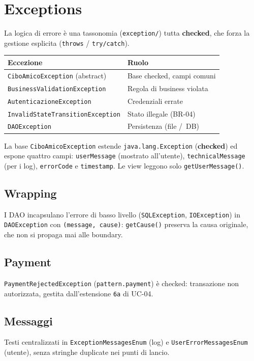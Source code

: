 \chapter{Exceptions}
\label{cap:exceptions}

La logica di errore è una tassonomia (\texttt{exception/}) tutta
\textbf{checked}, che forza la gestione esplicita (\texttt{throws} /
\texttt{try/catch}).

\begin{center}
\begin{tabular}{@{}ll@{}}
\toprule
\textbf{Eccezione} & \textbf{Ruolo} \\
\midrule
\texttt{CiboAmicoException} (abstract) & Base checked, campi comuni \\
\texttt{BusinessValidationException} & Regola di business violata \\
\quad\texttt{AutenticazioneException} & Credenziali errate \\
\quad\texttt{InvalidStateTransitionException} & Stato illegale (BR-04) \\
\texttt{DAOException} & Persistenza (file /\ DB) \\
\bottomrule
\end{tabular}
\end{center}

La base \texttt{CiboAmicoException} estende \texttt{java.lang.Exception}
(\textbf{checked}) ed espone quattro campi: \texttt{userMessage} (mostrato
all'utente), \texttt{technicalMessage} (per i log), \texttt{errorCode} e
\texttt{timestamp}. Le view leggono solo \texttt{getUserMessage()}.

\section{Wrapping}
\label{sec:exc_wrapping}

I DAO incapsulano l'errore di basso livello (\texttt{SQLException},
\texttt{IOException}) in \texttt{DAOException} con
\texttt{(message, cause)}: \texttt{getCause()} preserva la causa originale,
che non si propaga mai alle boundary.

\section{Payment}
\label{sec:exc_payment}

\texttt{PaymentRejectedException} (\texttt{pattern.payment}) è checked:
transazione non autorizzata, gestita dall'estensione \texttt{6a} di UC-04.

\section{Messaggi}
\label{sec:exc_messaggi}

Testi centralizzati in \texttt{ExceptionMessagesEnum} (log) e
\texttt{UserErrorMessagesEnum} (utente), senza stringhe duplicate nei punti
di lancio.